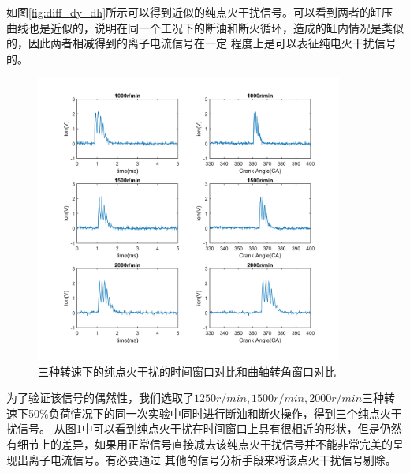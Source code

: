 如图\ref{fig:diff_dy_dh}所示可以得到近似的纯点火干扰信号。可以看到两者的缸压曲线也是近似的，说明在同一个工况下的断油和断火循环，造成的缸内情况是类似的，因此两者相减得到的离子电流信号在一定
程度上是可以表征纯电火干扰信号的。
\begin{figure}[H]
	\centering
	\includegraphics[width=0.9\textwidth]{thesis_figure/ion_chapter/pure_ign_comparison}
	\caption{三种转速下的纯点火干扰的时间窗口对比和曲轴转角窗口对比}
	\label{fig:pure_ign_comparison}
\end{figure}
\par 为了验证该信号的偶然性，我们选取了$1250r/min,1500r/min,2000r/min$三种转速下50\%负荷情况下的同一次实验中同时进行断油和断火操作，得到三个纯点火干扰信号。
从图\ref{fig:pure_ign_comparison}中可以看到纯点火干扰在时间窗口上具有很相近的形状，但是仍然有细节上的差异，如果用正常信号直接减去该纯点火干扰信号并不能非常完美的呈现出离子电流信号。有必要通过
其他的信号分析手段来将该点火干扰信号剔除。

